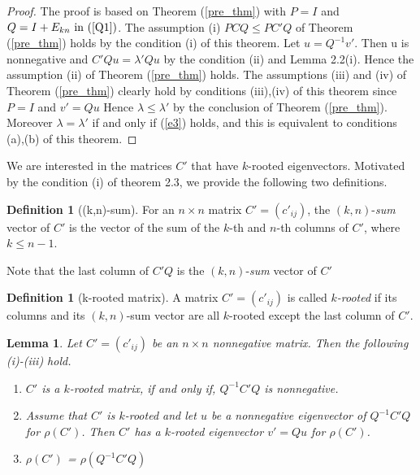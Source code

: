 \documentclass{article}
\theoremstyle{plain}
\newtheorem{lem}[thm]{Lemma}
\theoremstyle{definition}
\newtheorem{defn}[thm]{Definition}
\begin{document}
   
    \begin{proof}
        The proof is based on Theorem (\ref{pre_thm}) with $P = I$ and $Q = I + E_{kn} \text{ in } (\ref{Q1})$. 
        The assumption (i) $PCQ\leq PC'Q$ of Theorem (\ref{pre_thm}) holds by the condition (i) of this theorem. 
        Let $u = Q^{-1}v'$. Then u is nonnegative and $C'Qu = \lambda' Qu$ by the condition (ii) and 
        Lemma 2.2(i).  Hence the assumption (ii) of Theorem (\ref{pre_thm}) holds. The assumptions (iii) and (iv) 
        of Theorem (\ref{pre_thm}) clearly hold by conditions (iii),(iv) of this theorem since $P = I$ and $v'= Qu$  
        Hence $\lambda \leq \lambda' $ by the conclusion of Theorem (\ref{pre_thm}). Moreover $\lambda = \lambda'$ 
        if and only if (\ref{e3}) holds, and this is equivalent to conditions (a),(b) of this theorem. 
    \end{proof}   
    
    We are interested in the matrices $C'$ that have $k$-rooted eigenvectors.
    Motivated by the condition (i) of theorem 2.3, we provide the following two definitions. 

    \begin{defn}[(k,n)-sum]
        For an $n \times n$ matrix $C'=(c'_{ij})$, the $(k, n)$-{\it sum} vector of $C'$ is the vector of the sum of the $k$-th and  $n$-th columns of $C'$, where $k\leq n-1$.
    \end{defn}

    Note that the last column of $C'Q$ is the $(k, n)$-{\it sum} vector of $C'$

    \begin{defn}[k-rooted matrix]\label{m_rooted}
        A  matrix $C'=(c'_{ij})$ is called {\it $k$-rooted}  if its  columns and its $(k, n)$-sum vector are all $k$-rooted except the last column of $C'$.
    \end{defn}
% 

% 

    \begin{lem}\label{lma_m_rooted}
        Let $C'=(c'_{ij})$ be an $n\times n$ nonnegative matrix. Then the following (i)-(iii) hold.
            \begin{enumerate}
                \item[(i)]$C'$ is a $k$-rooted matrix, if and only if, $Q^{-1}C'Q$ is nonnegative.
                \item[(ii)]Assume that $C'$ is $k$-rooted and let $u$ be a nonnegative eigenvector of $Q^{-1}C'Q$ for $\rho(C')$. Then  $C'$ has a $k$-rooted eigenvector $v'=Qu$ for $\rho(C')$. 
                \item[(iii)] $\rho(C')$ = $\rho(Q^{-1}C'Q)$
            \end{enumerate}
    \end{lem}
\end{document}
